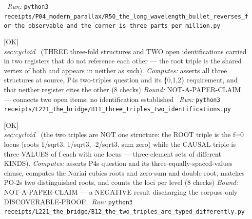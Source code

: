 \begin{description}
\ \emph{Run:} \texttt{python3 receipts/P04\_modern\_parallax/R50\_the\_long\_wavelength\_bullet\_reverses\_for\_the\_observable\_and\_the\_corner\_is\_three\_parts\_per\_million.py}
\item[\label{rcpt:B11_three_triples_two_identifications}\textbf{}\quad\texttt{B11\_three\_triples\_two\_identifications}]\hfill\textsf{[OK]}\\
\textit{sec:cycloid} \ (THREE three-fold structures and TWO open identifications carried in two registers that do not reference each other --- the root triple is the shared vertex of both and appears in neither as such). 
\emph{Computes:} asserts all three structures at source, P4s two-triples question and its \{0,1,2\} requirement, and that neither register cites the other (8 checks)
 \emph{Bound:} NOT-A-PAPER-CLAIM --- connects two open items; no identification established
\ \emph{Run:} \texttt{python3 receipts/L221\_the\_bridge/B11\_three\_triples\_two\_identifications.py}
\item[\label{rcpt:B12_the_two_triples_are_typed_differently}\textbf{}\quad\texttt{B12\_the\_two\_triples\_are\_typed\_differently}]\hfill\textsf{[OK]}\\
\textit{sec:cycloid} \ (the two triples are NOT one structure: the ROOT triple is the f=0 locus (roots 1/sqrt3, 1/sqrt3, -2/sqrt3, sum zero) while the CAUSAL triple is three VALUES of f each with one locus --- three-element sets of different KINDS). 
\emph{Computes:} asserts P4s question and its three-equally-spaced-values clause, computes the Nariai cubics roots and zero-sum and double root, matches PO-2s two distinguished roots, and counts the loci per level (8 checks)
 \emph{Bound:} NOT-A-PAPER-CLAIM --- a NEGATIVE result discharging the corpuss only DISCOVERABLE-PROOF
\ \emph{Run:} \texttt{python3 receipts/L221\_the\_bridge/B12\_the\_two\_triples\_are\_typed\_differently.py}
\end{description}\endgroup
